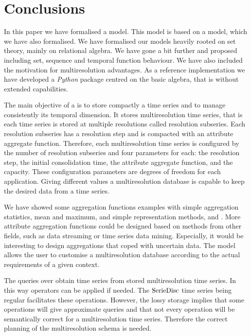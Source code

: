 \section{Conclusions}
\label{sec:concl-future-work}

In this paper we have formalised a  model. This model is
based on a  model, which we have also formalised.  We have
formalised our models heavily rooted on set theory, mainly on
relational algebra. We have gone a bit further and proposed
 including set, sequence and temporal function
behaviour. We have also included the motivation for multiresolution
advantages.  As a reference implementation we have developed a
\emph{Python} package centred on the basic algebra, that is without
extended  capabilities.



The main objective of a  is to store compactly a time
series and to manage consistently its temporal dimension.  It stores
multiresolution time series, that is each time series is stored at
multiple resolutions called resolution subseries.  Each resolution
subseries has a resolution step and is compacted with an attribute
aggregate function. Therefore, each multiresolution time series is
configured by the number of resolution subseries and four parameters
for each: the resolution step, the initial consolidation time, the
attribute aggregate function, and the capacity.  These configuration
parameters are degrees of freedom for each application. Giving
different values a multiresolution database is capable to keep the
desired data from a time series. %

We have showed some aggregation functions examples with simple
aggregation statistics, mean and maximum, and simple representation
methods, \dd{} and \zohe{}. More attribute aggregation functions could
be designed based on methods from other fields, such as data streaming
or time series data mining. Especially, it would be interesting to
design aggregations that coped with uncertain data.  The model allows
the user to customise a multiresolution database according to the
actual requirements of a given context.

The queries over  obtain time series from stored
multiresolution time series. In this way  operators can be
applied if needed. The $\operatorname{SerieDisc}$ time series being regular
facilitates these operations. However, the lossy storage implies that
some operations will give approximate queries and that not every
 operation will be semantically correct for a
multiresolution time series. Therefore the correct planning of the
multiresolution schema is needed.

